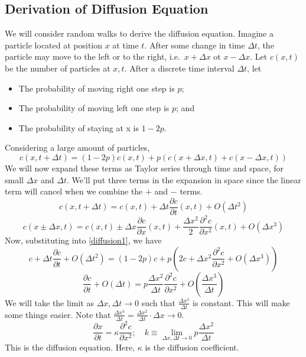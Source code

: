 \subsection{Derivation of Diffusion Equation}
We will consider random walks to derive the diffusion equation.
Imagine a particle located at position \(x\) at time \(t\).
After some change in time \(\Delta t\), the particle may move to the left or to the right, i.e.\ \(x+\Delta x\) ot \(x-\Delta x\).
Let \(c(x, t)\) be the number of particles at \(x, t\).
After a discrete time interval \(\Delta t\), let
\begin{itemize}
	\item The probability of moving right one step is \(p\);
	\item The probability of moving left one step is \(p\); and
	\item The probability of staying at x is \(1-2p\).
\end{itemize}
Considering a large amount of particles,
\begin{equation}\label{diffusion1}
	c(x, t+\Delta t) = (1-2p)c(x, t) + p\left( c(x+\Delta x, t) + c(x-\Delta x, t) \right)
\end{equation}
We will now expand these terms as Taylor series through time and space, for small \(\Delta x\) and \(\Delta t\).
We'll put three terms in the expansion in space since the linear term will cancel when we combine the \(+\) and \(-\) terms.
\[
	c(x, t+\Delta t) = c(x, t) + \Delta t \frac{\partial c}{\partial t}(x, t) + O(\Delta t^2)
\]
\[
	c(x\pm\Delta x, t) = c(x, t) \pm \Delta x \frac{\partial c}{\partial x}(x, t) + \frac{\Delta x^2}{2}\frac{\partial^2 c}{\partial x^2}(x, t) + O(\Delta x^3)
\]
Now, substituting into \eqref{diffusion1}, we have
\[
	c + \Delta t \frac{\partial c}{\partial t} + O(\Delta t^2) = (1-2p)c + p\left( 2c + \Delta x^2\frac{\partial^2 c}{\partial x^2} + O(\Delta x^3) \right)
\]
\[
	\frac{\partial c}{\partial t} + O(\Delta t) = p\frac{\Delta x^2}{\Delta t}\frac{\partial^2 c}{\partial x^2} + O\left(\frac{\Delta x^3}{\Delta t}\right)
\]
We will take the limit as \(\Delta x, \Delta t \to 0\) such that \(\frac{\Delta x^2}{\Delta t}\) is constant.
This will make some things easier.
Note that \(\frac{\Delta x^3}{\Delta t} = \frac{\Delta x^2}{\Delta t} \cdot \Delta x \to 0\).
\[
	\frac{\partial x}{\partial t} = \kappa\frac{\partial^2 c}{\partial x^2};\quad k \equiv \lim_{\Delta x,\Delta t \to 0}p\frac{\Delta x^2}{\Delta t}
\]
This is the diffusion equation.
Here, \(\kappa\) is the diffusion coefficient.

